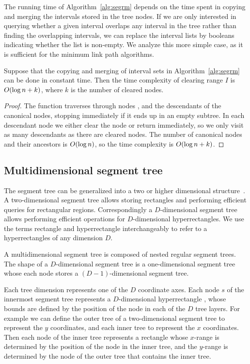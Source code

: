 \documentclass[english,gradu]{tktltiki2018}
\begin{document}
The running time of Algorithm~\ref{alg:segrm} depends on the time spent in copying and merging the intervals stored in the tree nodes.
If we are only interested in querying whether a given interval overlaps any interval in the tree rather than finding the overlapping intervals, we can replace the interval lists by booleans indicating whether the list is non-empty.
We analyze this more simple case, as it is sufficient for the minimum link path algorithms.

\begin{lem}\label{lem:segrmtime}Suppose that the copying and merging of interval sets in Algorithm~\ref{alg:segrm} can be done in constant time.
Then the time complexity of clearing range $I$ is $O(\log n + k)$, where $k$ is the number of cleared nodes.\end{lem}
\begin{proof}
The function \cleariv traverses through nodes ,  and the descendants of the canonical nodes, stopping immediately if it ends up in an empty subtree.
In each descendant node we either clear the node or return immediately, so we only visit as many descendants as there are cleared nodes.
The number of canonical nodes and their ancestors is $O(\log n)$, so the time complexity is $O(\log n + k)$.
\end{proof}


\subsection{Multidimensional segment tree}

The segment tree can be generalized into a two or higher dimensional structure~\cite{highseg}.
A two-dimensional segment tree allows storing rectangles and performing efficient queries for rectangular regions.
Correspondingly a $D$-dimensional segment tree allows performing efficient operations for $D$-dimensional hyperrectangles.
We use the terms rectangle and hyperrectangle interchangeably to refer to a hyperrectangles of any dimension $D$.

A multidimensional segment tree is composed of nested regular segment trees.
The shape of a $D$-dimensional segment tree is a one-dimensional segment tree whose each node stores a $(D-1)$-dimensional segment tree.

Each tree dimension represents one of the $D$ coordinate axes.
Each node $s$ of the innermost segment tree represents a $D$-dimensional hyperrectangle , whose bounds are defined by the position of the node in each of the $D$ tree layers.
For example we can define the outer tree of a two-dimensional segment tree to represent the $y$ coordinates, and each inner tree to represent the $x$ coordinates.
Then each node of the inner tree represents a rectangle whose $x$-range is determined by the position of the node in the inner tree, and the $y$-range is determined by the node of the outer tree that contains the inner tree.
\end{document}
